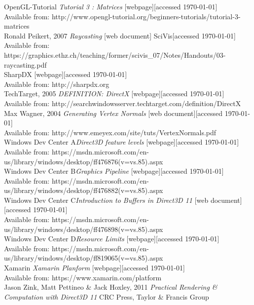 \documentclass[twoside, english, 11pt]{report}
\begin{document}
\small OpenGL-Tutorial \textit{Tutorial 3 : Matrices} [webpage][accessed \today] \\
Available from: http://www.opengl-tutorial.org/beginners-tutorials/tutorial-3-matrices\\

\small Ronald Peikert, 2007 \textit{Raycasting} [web document] SciVis[accessed \today] \\
Available from: https://graphics.ethz.ch/teaching/former/scivis\_07/Notes/Handouts/03-raycasting.pdf\\

\small SharpDX [webpage][accessed \today] \\
Available from: http://sharpdx.org\\

\small TechTarget, 2005 \textit{DEFINITION: DirectX} [webpage][accessed \today] \\
Available from: http://searchwindowsserver.techtarget.com/definition/DirectX\\

\small Max Wagner, 2004 \textit{Generating Vertex Normals} [web document][accessed \today] \\
Available from: http://www.emeyex.com/site/tuts/VertexNormals.pdf\\

\small Windows Dev Center A\textit{Direct3D feature levels} [webpage][accessed \today] \\
Available from: https://msdn.microsoft.com/en-us/library/windows/desktop/ff476876(v=vs.85).aspx\\

\small Windows Dev Center B\textit{Graphics Pipeline} [webpage][accessed \today] \\
Available from: https://msdn.microsoft.com/en-us/library/windows/desktop/ff476882(v=vs.85).aspx\\

\small Windows Dev Center C\textit{Introduction to Buffers in Direct3D 11} [web document][accessed \today] \\
Available from: https://msdn.microsoft.com/en-us/library/windows/desktop/ff476898(v=vs.85).aspx\\

\small Windows Dev Center D\textit{Resource Limits } [webpage][accessed \today] \\
Available from: https://msdn.microsoft.com/en-us/library/windows/desktop/ff819065(v=vs.85).aspx\\

\small Xamarin \textit{Xamarin Planform} [webpage][accessed \today] \\
Available from: https://www.xamarin.com/platform\\

\small Jason Zink, Matt Pettineo \& Jack Hoxley, 2011 \textit{Practical Rendering \& Computation with Direct3D 11} CRC Press, Taylor \& Francis Group \\
\end{document}
